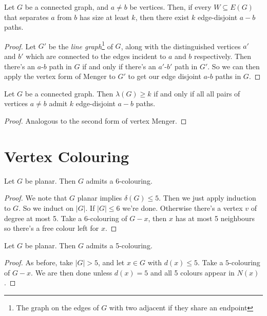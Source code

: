 \documentclass[a3paper, 10pt]{article}
\begin{document}
\begin{multicols*}{5}
\begin{theorem}
Let $G$ be a connected graph, and $a \neq b$ be vertices. Then, if every $W \subseteq E(G)$ that separates $a$ from $b$ has size at least $k$, then there exist $k$ edge-disjoint $a-b$ paths.
\end{theorem}
\begin{proof}
    Let $G'$ be the \emph{line graph}\footnote{The graph on the edges of $G$ with two adjacent if they share an endpoint} of $G$, along with the distinguished vertices $a'$ and $b'$ which are connected to the edges incident to $a$ and $b$ respectively. Then there's an $a$-$b$ path in $G$ if and only if there's an $a'$-$b'$ path in $G'$. So we can then apply the vertex form of Menger to $G'$ to get our edge disjoint $a$-$b$ paths in $G$.
\end{proof}

\begin{theorem}
    Let $G$ be a connected graph. Then $\lambda(G) \geq k$ if and only if all all pairs of vertices $a \neq b$ admit $k$ edge-disjoint $a-b$ paths.
\end{theorem}
\begin{proof}
    Analogous to the second form of vertex Menger.
\end{proof}

\section{Vertex Colouring}

\begin{proposition}
    Let $G$ be planar. Then $G$ admits a 6-colouring.
\end{proposition}
\begin{proof}
    We note that $G$ planar implies $\delta(G) \leq 5$. Then we just apply induction to $G$. So we induct on $|G|$. If $|G| \leq 6$ we're done. Otherwise there's a vertex $v$ of degree at most 5. Take a 6-colouring of $G - x$, then $x$ has at most 5 neighbours so there's a free colour left for $x$.
\end{proof}

\begin{proposition}
    Let $G$ be planar. Then $G$ admits a 5-colouring.
\end{proposition}
\begin{proof}
As before, take $|G| > 5$, and let $x \in G$ with $d(x) \leq 5$. Take a $5$-colouring of $G - x$. We are then done unless $d(x) = 5$ and all 5 colours appear in $N(x)$.


\end{proof}
\end{multicols*}
\end{document}
